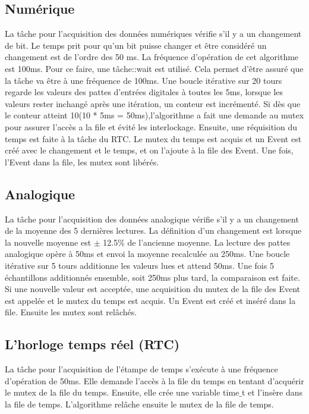\documentclass[12pt]{article}
\begin{document}
\subsection{Numérique}
La tâche pour l'acquisition des données numériques vérifie s'il y a un changement de bit. Le temps prit pour qu'un bit puisse changer et être considéré un changement est de l'ordre des 50 ms. La fréquence d'opération de cet algorithme est 100ms. Pour ce faire, une tâche::wait est utilisé. Cela permet d'être assuré que la tâche va être à une fréquence de 100ms. Une boucle itérative sur 20 tours regarde les valeurs des pattes d'entrées digitales à toutes les 5ms, lorsque les valeurs rester inchangé après une itération, un conteur est incrémenté. Si dès que le conteur atteint 10(10 * 5ms = 50ms),l'algorithme a fait une demande au mutex pour assurer l'accès a la file et évité les interlockage. Ensuite, une réquisition du temps est faite à la tâche du RTC. Le mutex du temps est acquis et un Event est créé avec le changement et le temps, et on l'ajoute à la file des Event. Une fois, l'Event dans la file, les mutex sont libérés.
\subsection{Analogique}
La tâche pour l'acquisition des données analogique vérifie s'il y a un changement de la moyenne des 5 dernières lectures. La définition d'un changement est lorsque la nouvelle moyenne est $\pm$ 12.5$\%$ de l'ancienne moyenne. La lecture des pattes analogique opère à 50ms et envoi la moyenne recalculée au 250ms. Une boucle itérative sur 5 tours additionne les valeurs lues et attend 50ms. Une fois 5 échantillons additionnés ensemble, soit 250ms plus tard, la comparaison est faite. Si une nouvelle valeur est acceptée, une acquisition du mutex de la file des Event est appelée et le mutex du temps est acquis. Un Event est créé et inséré dans la file. Ensuite les mutex sont relâchés. 
\subsection{L'horloge temps réel (RTC)}
La tâche pour l'acquisition de l'étampe de temps s'exécute à une fréquence d'opération de 50ms. Elle demande l'accès à la file du temps en tentant d'acquérir le mutex de la file du temps. Ensuite, elle crée une variable time$\_$t et l'insère dans la file de temps. L'algorithme relâche ensuite le mutex de la file de temps.
\end{document}
